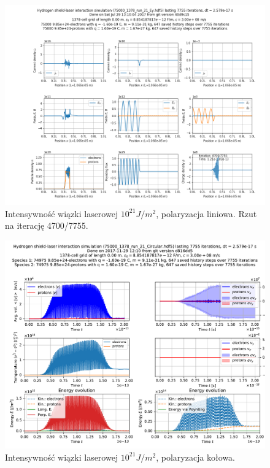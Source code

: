 \begin{figure}[h!]
  \includegraphics[width=\textwidth]{Images/75000_1378_run_21_Ey_004700}
  \caption{Intensywność wiązki laserowej $10^{21} J/m^2$, polaryzacja liniowa. Rzut na iterację 4700/7755.\label{fig:laser-21-Ey-snapshot}}
\end{figure}

\begin{figure}[h!]
  \includegraphics[width=\textwidth]{Images/75000_1378_run_21_Circular}
  \caption{Intensywność wiązki laserowej $10^{21} J/m^2$, polaryzacja kołowa.\label{fig:laser-21-Circular}}
\end{figure}

